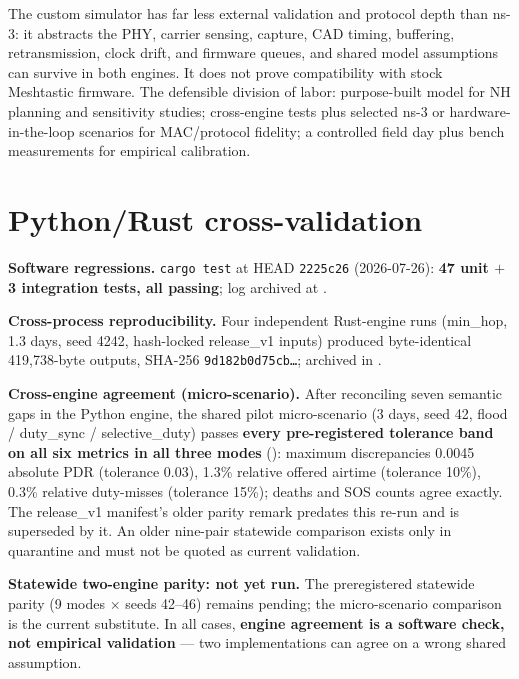 \documentclass[11pt]{article}
\newcommand{\code}[1]{\texttt{\small #1}}
\begin{document}
The custom simulator has far less external validation and protocol depth
than ns-3: it abstracts the PHY, carrier sensing, capture, CAD timing,
buffering, retransmission, clock drift, and firmware queues, and shared model
assumptions can survive in both engines. It does not prove compatibility with
stock Meshtastic firmware. The defensible division of labor: purpose-built
model for NH planning and sensitivity studies; cross-engine tests plus
selected ns-3 or hardware-in-the-loop scenarios for MAC/protocol fidelity; a
controlled field day plus bench measurements for empirical calibration.

\section{Python/Rust cross-validation}\label{sec:xval}

\textbf{Software regressions.} \code{cargo test} at HEAD \code{2225c26}
(2026-07-26): \textbf{47 unit $+$ 3 integration tests, all passing}; log
archived at .

\textbf{Cross-process reproducibility.} Four independent Rust-engine runs
(min\_hop, 1.3 days, seed 4242, hash-locked release\_v1 inputs) produced
byte-identical 419{,}738-byte outputs, SHA-256 \code{9d182b0d75cb\ldots};
archived in .

\textbf{Cross-engine agreement (micro-scenario).} After reconciling seven
semantic gaps in the Python engine, the shared pilot micro-scenario (3 days,
seed 42, flood / duty\_sync / selective\_duty) passes \textbf{every
pre-registered tolerance band on all six metrics in all three modes}
(): maximum
discrepancies 0.0045 absolute PDR (tolerance 0.03), 1.3\% relative offered
airtime (tolerance 10\%), 0.3\% relative duty-misses (tolerance 15\%); deaths
and SOS counts agree exactly. The release\_v1 manifest's older parity remark
predates this re-run and is superseded by it. An older nine-pair statewide
comparison exists only in quarantine and must not be quoted as current
validation.

\textbf{Statewide two-engine parity: not yet run.} The preregistered
statewide parity (9 modes $\times$ seeds 42--46) remains pending; the
micro-scenario comparison is the current substitute. In all cases,
\textbf{engine agreement is a software check, not empirical validation} ---
two implementations can agree on a wrong shared assumption.
\end{document}

